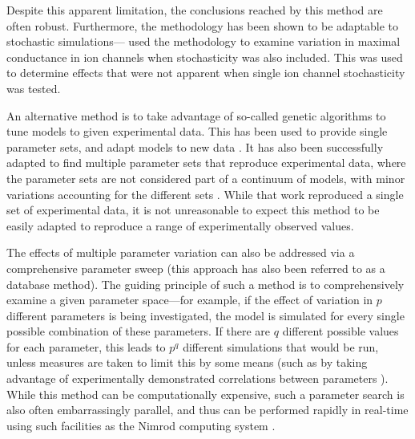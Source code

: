 \documentclass[../thesis-main.tex]{subfiles}
\begin{document}
Despite this apparent limitation, the conclusions reached by this method are often robust. Furthermore, the methodology has been shown to be adaptable to stochastic simulations---\citet{Heijman2013} used the methodology to examine variation in maximal conductance in ion channels when stochasticity was also included. This was used to determine effects that were not apparent when single ion channel stochasticity was tested.

An alternative method is to take advantage of so-called genetic algorithms to tune models to given experimental data. This has been used to provide single parameter sets, and adapt models to new data \citep{Kherlopian2011}. It has also been successfully adapted to find multiple parameter sets that reproduce experimental data, where the parameter sets are not considered part of a continuum of models, with minor variations accounting for the different sets \citep{Achard2006, Syed2005}. While that work reproduced a single set of experimental data, it is not unreasonable to expect this method to be easily adapted to reproduce a range of experimentally observed values.

The effects of multiple parameter variation can also be addressed via a comprehensive parameter sweep (this approach has also been referred to as a database method). The guiding principle of such a method is to comprehensively examine a given parameter space---for example, if the effect of variation in $p$ different parameters is being investigated, the model is simulated for every single possible combination of these parameters. If there are $q$ different possible values for each parameter, this leads to $p^q$ different simulations that would be run, unless measures are taken to limit this by some means (such as by taking advantage of experimentally demonstrated correlations between parameters \citep{Schulz2006}). While this method can be computationally expensive, such a parameter search is also often embarrassingly parallel, and thus can be performed rapidly in real-time using such facilities as the Nimrod computing system \citep{Abramson2000, Abramson1997, Abramson2009, Abramson2010}.
\end{document}
